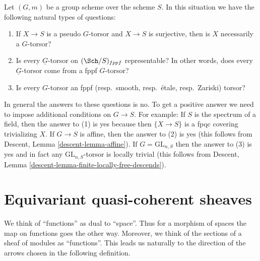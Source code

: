 \begin{remark}
\label{remark-fun-with-torsors}
Let $(G, m)$ be a group scheme over the scheme $S$.
In this situation we have the following natural types of questions:
\begin{enumerate}
\item If $X \to S$ is a pseudo $G$-torsor and $X \to S$ is surjective,
then is $X$ necessarily a $G$-torsor?
\item Is every $\underline{G}$-torsor on $(\Sch/S)_{fppf}$
representable? In other words, does every $\underline{G}$-torsor
come from a fppf $G$-torsor?
\item Is every $G$-torsor an
fppf (resp.\ smooth, resp.\ \'etale, resp.\ Zariski) torsor?
\end{enumerate}
In general the answers to these questions is no. To get a positive answer
we need to impose additional conditions on $G \to S$.
For example:
If $S$ is the spectrum of a field, then the answer to (1) is yes
because then $\{X \to S\}$ is a fpqc covering trivializing $X$.
If $G \to S$ is affine, then the answer to (2) is yes
(this follows from Descent, Lemma \ref{descent-lemma-affine}).
If $G = \text{GL}_{n, S}$ then the answer to (3) is yes
and in fact any $\text{GL}_{n, S}$-torsor is locally trivial
(this follows from
Descent, Lemma \ref{descent-lemma-finite-locally-free-descends}).
\end{remark}



\section{Equivariant quasi-coherent sheaves}
\label{section-equivariant}

\noindent
We think of ``functions'' as dual to ``space''. Thus for a morphism of spaces
the map on functions goes the other way. Moreover, we think of the
sections of a sheaf of modules as ``functions''. This leads us naturally
to the direction of the arrows chosen in the following definition.

